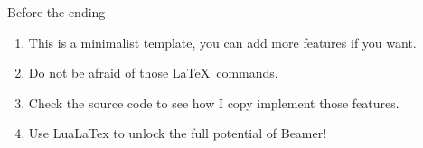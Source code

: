 \documentclass[aspectratio=169]{beamer}
\begin{document}
\begin{frame}{Before the ending}
  \begin{enumerate}
    \item This is a \alert{minimalist} template, you can add more features if you want.
    \item Do \alert{not} be afraid of those \LaTeX\ commands.
    \item Check the \alert{source code} to see how I \textcolor{CUHKyellow}{{\tiny copy}} implement those features.
    \item Use \alert{LuaLaTex} to unlock the full potential of Beamer!
  \end{enumerate}

\end{frame}

\end{document}
